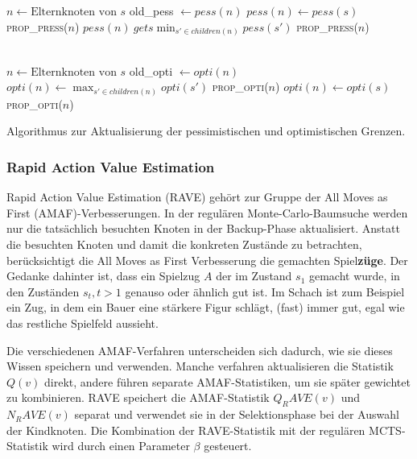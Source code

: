\begin{algorithm}[H]
\begin{algorithmic}
		\State $n \gets \text{Elternknoten von }s$
		\State old\_pess $\gets pess(n)$
				\State $pess(n) \gets pess(s)$
				\State \textsc{prop\_press}($n$)
			\Else
				\State $pess(n) \ gets \min_{s' \in children(n)}pess(s')$
					\State \textsc{prop\_press}($n$)
				\EndIf
			\EndIf
		\EndIf
	\EndIf
\EndFunction

\\
		\State $n \gets \text{Elternknoten von }s$
		\State old\_opti $\gets opti(n)$
				\State $opti(n) \gets \max_{s' \in children(n)}opti(s')$
					\State \textsc{prop\_opti}($n$)
				\EndIf
			\Else
				\State $opti(n) \gets opti(s)$
				\State \textsc{prop\_opti}($n$)
			\EndIf
		\EndIf
	\EndIf
\EndFunction
\end{algorithmic}
\caption{Algorithmus zur Aktualisierung der pessimistischen und optimistischen Grenzen.\footnotemark}
\label{algo:prop-scorebound}
\end{algorithm}

\subsubsection{Rapid Action Value Estimation}

Rapid Action Value Estimation (RAVE) gehört zur Gruppe der All Moves as First (AMAF)-Verbesserungen.
In der regulären Monte-Carlo-Baumsuche werden nur die tatsächlich besuchten Knoten in der Backup-Phase aktualisiert.
Anstatt die besuchten Knoten und damit die konkreten Zustände zu betrachten, berücksichtigt die All Moves as First Verbesserung die gemachten Spiel\textbf{züge}. Der Gedanke dahinter ist, dass ein Spielzug $A$ der im Zustand $s_1$ gemacht wurde, in den Zuständen $s_t, t > 1$ genauso oder ähnlich gut ist. Im Schach ist zum Beispiel ein Zug, in dem ein Bauer eine stärkere Figur schlägt, (fast) immer gut, egal wie das restliche Spielfeld aussieht.

Die verschiedenen AMAF-Verfahren unterscheiden sich dadurch, wie sie dieses Wissen speichern und verwenden. Manche verfahren aktualisieren die Statistik $Q(v)$ direkt, andere führen separate AMAF-Statistiken, um sie später gewichtet zu kombinieren. RAVE speichert die AMAF-Statistik $Q_RAVE(v)$ und $N_RAVE(v)$ separat und verwendet sie in der Selektionsphase bei der Auswahl der Kindknoten. Die Kombination der RAVE-Statistik mit der regulären MCTS-Statistik wird durch einen Parameter $\beta$ gesteuert.

